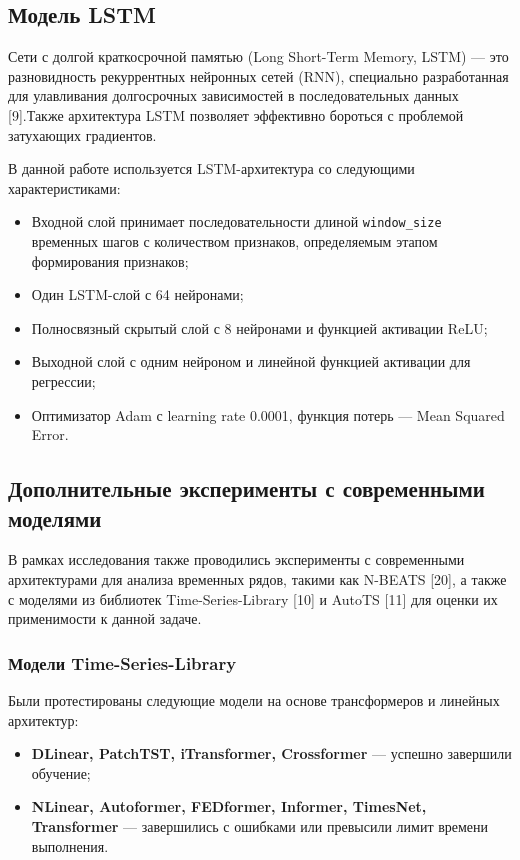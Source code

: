 \subsection{Модель LSTM}
\hspace*{1.25cm}Сети с долгой краткосрочной памятью (Long Short-Term Memory, LSTM) — это разновидность рекуррентных нейронных сетей (RNN), специально разработанная для улавливания долгосрочных зависимостей в последовательных данных [9].Также архитектура LSTM позволяет эффективно бороться с проблемой затухающих градиентов.

\hspace*{1.25cm}В данной работе используется LSTM-архитектура со следующими характеристиками:
\begin{itemize}
	\item Входной слой принимает последовательности длиной \texttt{window\_size} временных шагов с количеством признаков, определяемым этапом формирования признаков;
	\item Один LSTM-слой с 64 нейронами;
	\item Полносвязный скрытый слой с 8 нейронами и функцией активации ReLU;
	\item Выходной слой с одним нейроном и линейной функцией активации для регрессии;
	\item Оптимизатор Adam с learning rate 0.0001, функция потерь --- Mean Squared Error.
\end{itemize}

\subsection{Дополнительные эксперименты с современными моделями}

\hspace*{1.25cm}В рамках исследования также проводились эксперименты с современными архитектурами для анализа временных рядов, такими как N-BEATS [20], а также с моделями из библиотек Time-Series-Library [10] и AutoTS [11] для оценки их применимости к данной задаче.

\subsubsection{Модели Time-Series-Library}

\hspace*{1.25cm}Были протестированы следующие модели на основе трансформеров и линейных архитектур:
\begin{itemize}
	\item \textbf{DLinear, PatchTST, iTransformer, Crossformer} --- успешно завершили обучение;
	\item \textbf{NLinear, Autoformer, FEDformer, Informer, TimesNet, Transformer} --- завершились с ошибками или превысили лимит времени выполнения.
\end{itemize}


